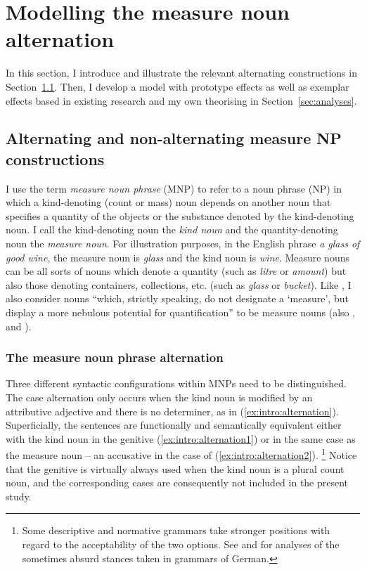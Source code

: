\section{Modelling the measure noun alternation}
\label{sec:germanmeasurenps}

In this section, I introduce and illustrate the relevant alternating constructions in Section~\ref{sec:descriptive}.
Then, I develop a model with prototype effects as well as exemplar effects based in existing research and my own theorising in Section~\ref{sec:analyses}.

\subsection{Alternating and non-alternating measure NP constructions}
\label{sec:descriptive}

I use the term \textit{measure noun phrase} (MNP) to refer to a noun phrase (NP) in which a kind-denoting (count or mass) noun depends on another noun that specifies a quantity of the objects or the substance denoted by the kind-denoting noun.
I call the kind-denoting noun the \textit{kind noun} and the quantity-denoting noun the \textit{measure noun}.
For illustration purposes, in the English phrase \textit{a glass of good wine}, the measure noun is \textit{glass} and the kind noun is \textit{wine}.
Measure nouns can be all sorts of nouns which denote a quantity (such as \textit{litre} or \textit{amount}) but also those denoting containers, collections, etc. (such as \textit{glass} or \textit{bucket}).
Like \citet[284]{Brems2003}, I also consider nouns ``which, strictly speaking, do not designate a `measure', but display a more nebulous potential for quantification'' to be measure nouns (also \citealp[530]{Koptjevskaja2001}, and \citealp[338]{Rutkowski2007}).

\subsubsection{The measure noun phrase alternation}
\label{sec:themeasurenounphrasealternation}

Three different syntactic configurations within MNPs need to be distinguished.
The case alternation only occurs when the kind noun is modified by an attributive adjective and there is no determiner, as in (\ref{ex:intro:alternation}).
Superficially, the sentences are functionally and semantically equivalent either with the kind noun in the genitive (\ref{ex:intro:alternation1}) or in the same case as the measure noun -- an accusative in the case of (\ref{ex:intro:alternation2}).%
\footnote{Some descriptive and normative grammars take stronger positions with regard to the acceptability of the two options.
See \cite{Hentschel1993} and \cite{Zimmer2015} for analyses of the sometimes absurd stances taken in grammars of German.
}
Notice that the genitive is virtually always used when the kind noun is a plural count noun, and the corresponding cases are consequently not included in the present study.

